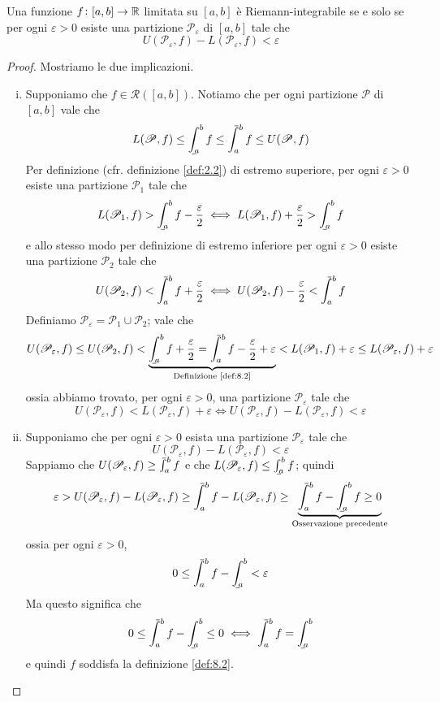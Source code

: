 \begin{theorem}
    \label{th:8.1}
    Una funzione $f\colon [a,b]\to \amsbb{R}$ limitata su $[a,b]$ è Riemann-integrabile se e solo se per ogni $\varepsilon>0$ esiste una partizione $\mathscr{P}_\varepsilon$ di $[a,b]$ tale che
    \[
    U(\mathscr{P}_\varepsilon, f) - L(\mathscr{P}_\varepsilon, f)< \varepsilon
    \]
\end{theorem}
\begin{proof}
    Mostriamo le due implicazioni.
    \begin{enumerate}[(i)]
        \item Supponiamo che $f\in\mathscr{R}([a,b])$. Notiamo che per ogni partizione $\mathscr{P}$ di $[a,b]$ vale che
        \[
        L(\mathscr{P},f) \le \bint_a^b f \le \aint_a^b f \le U(\mathscr{P}, f)
        \]
        Per definizione (cfr. definizione \ref{def:2.2}) di estremo superiore, per ogni $\varepsilon>0$ esiste una partizione $\mathscr{P}_1$ tale che
        \[
        L(\mathscr{P}_1, f) > \bint_a^b f -\frac{\varepsilon}{2} \iff L(\mathscr{P}_1, f) + \frac{\varepsilon}{2}> \bint_a^b f
        \]
        e allo stesso modo per definizione di estremo inferiore per ogni $\varepsilon>0$ esiste una partizione $\mathscr{P}_2$ tale che
        \[
        U(\mathscr{P}_2, f) < \aint_a^b f +\frac{\varepsilon}{2} \iff U(\mathscr{P}_2, f) - \frac{\varepsilon}{2}<\aint_a^b f
        \]
        Definiamo $\mathscr{P}_\varepsilon = \mathscr{P_1}\cup \mathscr{P}_2$; vale che
        \[
        U(\mathscr{P}_\varepsilon, f) \le U(\mathscr{P}_2, f) < \underbrace{\bint_a^bf +\frac{\varepsilon}{2} = \aint_a^b f -\frac{\varepsilon}{2}+\varepsilon}_{\text{Definizione \ref{def:8.2}}} < L(\mathscr{P}_1, f)+\varepsilon \le L(\mathscr{P}_\varepsilon, f) + \varepsilon
        \]
        ossia abbiamo trovato, per ogni $\varepsilon>0$, una partizione $\mathscr{P}_\varepsilon$ tale che
        \[
        U(\mathscr{P}_\varepsilon, f) < L(\mathscr{P}_\varepsilon, f) + \varepsilon \iff U(\mathscr{P}_\varepsilon, f) - L(\mathscr{P}_\varepsilon, f) <  \varepsilon
        \]
        \item Supponiamo che per ogni $\varepsilon>0$ esista una partizione $\mathscr{P}_\varepsilon$ tale che
        \[
        U(\mathscr{P}_\varepsilon, f) - L(\mathscr{P}_\varepsilon, f)< \varepsilon
        \]
        Sappiamo che $U(\mathscr{P}_\varepsilon, f)\ge \aint_a^b f$ e che $L(\mathscr{P}_\varepsilon, f)\le \bint_a^b f$; quindi
        \[
        \varepsilon>U(\mathscr{P}_\varepsilon, f) - L(\mathscr{P}_\varepsilon, f) \ge \aint_a^b f - L(\mathscr{P}_\varepsilon, f) \ge \underbrace{\aint_a^b f - \bint_a^b f\ge 0}_{\text{Osservazione precedente}}
        \]
        ossia per ogni $\varepsilon>0$,
        \[
        0\le \aint_a^b f - \bint_a^b <\varepsilon
        \]
        Ma questo significa che
        \[
        0\le \aint_a^b f - \bint_a^b \le 0 \iff \aint_a^b f = \bint_a^b
        \]
        e quindi $f$ soddisfa la definizione \ref{def:8.2}.\qedhere
    \end{enumerate}
\end{proof}

